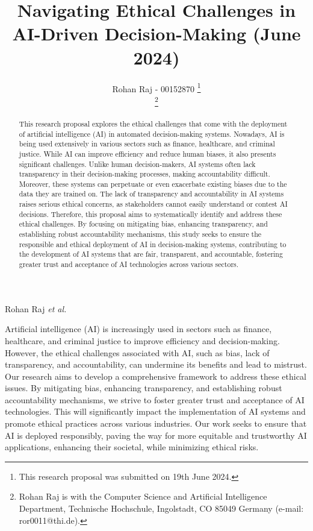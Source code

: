 \documentclass[journal]{IEEEtai}
\begin{document}
\title{Navigating Ethical Challenges in AI-Driven Decision-Making (June 2024)} 

\author{Rohan Raj - 00152870
\thanks{This research proposal was submitted on 19th June 2024.}

\thanks{Rohan Raj is with the Computer Science and Artificial Intelligence Department, Technische Hochschule, Ingolstadt, CO 85049 Germany (e-mail: ror0011@thi.de).}}

{Rohan Raj \MakeLowercase{\textit{et al.}}}

\maketitle
\begin{abstract}

This research proposal explores the ethical challenges that come with the deployment of artificial intelligence (AI) in automated decision-making systems. Nowadays, AI is being used extensively in various sectors such as finance, healthcare, and criminal justice. While AI can improve efficiency and reduce human biases, it also presents significant challenges. Unlike human decision-makers, AI systems often lack transparency in their decision-making processes, making accountability difficult. Moreover, these systems can perpetuate or even exacerbate existing biases due to the data they are trained on. The lack of transparency and accountability in AI systems raises serious ethical concerns, as stakeholders cannot easily understand or contest AI decisions. Therefore, this proposal aims to systematically identify and address these ethical challenges. By focusing on mitigating bias, enhancing transparency, and establishing robust accountability mechanisms, this study seeks to ensure the responsible and ethical deployment of AI in decision-making systems, contributing to the development of AI systems that are fair, transparent, and accountable, fostering greater trust and acceptance of AI technologies across various sectors.
\end{abstract}

\begin{IEEEImpStatement}

Artificial intelligence (AI) is increasingly used in sectors such as finance, healthcare, and criminal justice to improve efficiency and decision-making. However, the ethical challenges associated with AI, such as bias, lack of transparency, and accountability, can undermine its benefits and lead to mistrust. Our research aims to develop a comprehensive framework to address these ethical issues. By mitigating bias, enhancing transparency, and establishing robust accountability mechanisms, we strive to foster greater trust and acceptance of AI technologies. This will significantly impact the implementation of AI systems and promote ethical practices across various industries. Our work seeks to ensure that AI is deployed responsibly, paving the way for more equitable and trustworthy AI applications, enhancing their societal, while minimizing ethical risks.

\end{IEEEImpStatement}
\end{document}
